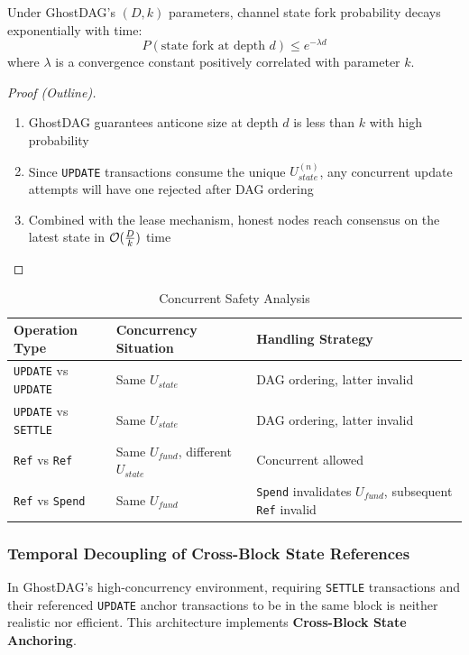 \begin{theorem}
Under GhostDAG's $(D, k)$ parameters, channel state fork probability decays exponentially with time:
$$P(\text{state fork at depth } d) \leq e^{-\lambda d}$$
where $\lambda$ is a convergence constant positively correlated with parameter $k$.
\end{theorem}

\begin{proof}[Proof (Outline)]
\begin{enumerate}
    \item GhostDAG guarantees anticone size at depth $d$ is less than $k$ with high probability
    \item Since \texttt{UPDATE} transactions consume the unique $U_{state}^{(n)}$, any concurrent update attempts will have one rejected after DAG ordering
    \item Combined with the lease mechanism, honest nodes reach consensus on the latest state in $\mathcal{O}(\frac{D}{k})$ time
\end{enumerate}
\end{proof}

\begin{table}[htbp]
\centering
\small
\caption{Concurrent Safety Analysis}
\begin{tabular}{@{}llp{5cm}@{}}
\toprule
\textbf{Operation Type} & \textbf{Concurrency Situation} & \textbf{Handling Strategy} \\
\midrule
\texttt{UPDATE} vs \texttt{UPDATE} & Same $U_{state}$ & DAG ordering, latter invalid \\
\texttt{UPDATE} vs \texttt{SETTLE} & Same $U_{state}$ & DAG ordering, latter invalid \\
\texttt{Ref} vs \texttt{Ref} & Same $U_{fund}$, different $U_{state}$ & Concurrent allowed \\
\texttt{Ref} vs \texttt{Spend} & Same $U_{fund}$ & \texttt{Spend} invalidates $U_{fund}$, subsequent \texttt{Ref} invalid \\
\bottomrule
\end{tabular}
\end{table}

\subsubsection{Temporal Decoupling of Cross-Block State References}

In GhostDAG's high-concurrency environment, requiring \texttt{SETTLE} transactions and their referenced \texttt{UPDATE} anchor transactions to be in the same block is neither realistic nor efficient. This architecture implements \textbf{Cross-Block State Anchoring}.

